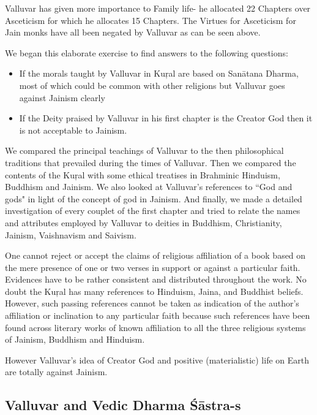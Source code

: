 Valluvar has given more importance to Family life- he allocated 22 Chapters over Asceticism for which he allocates 15 Chapters. The Virtues for Asceticism for Jain monks have all been negated by Valluvar as can be seen above.

We began this elaborate exercise to find answers to the following questions:

\begin{itemize}
\item If the morals taught by Valluvar in Kuŗal are based on Sanātana Dharma, most of which could be common with other religions but Valluvar goes against Jainism clearly

 \item If the Deity praised by Valluvar in his first chapter is the Creator God then it is not acceptable to Jainism.

\end{itemize}

We compared the principal teachings of Valluvar to the then philosophical traditions that prevailed during the times of Valluvar. Then we compared the contents of the Kuŗal with some ethical treatises in Brahminic Hinduism, Buddhism and Jainism. We also looked at Valluvar's references to “God and gods" in light of the concept of god in Jainism. And finally, we made a detailed investigation of every couplet of the first chapter and tried to relate the names and attributes employed by Valluvar to deities in Buddhism, Christianity, Jainism, Vaishnavism and Saivism.

One cannot reject or accept the claims of religious affiliation of a book based on the mere presence of one or two verses in support or against a particular faith. Evidences have to be rather consistent and distributed throughout the work. No doubt the Kuŗal has many references to Hinduism, Jaina, and Buddhist beliefs. However, such passing references cannot be taken as indication of the author's affiliation or inclination to any particular faith because such references have been found across literary works of known affiliation to all the three religious systems of Jainism, Buddhism and Hinduism.

However Valluvar’s idea of Creator God and positive (materialistic) life on Earth are totally against Jainism.

\subsection*{Valluvar and Vedic Dharma Śāstra-s}

